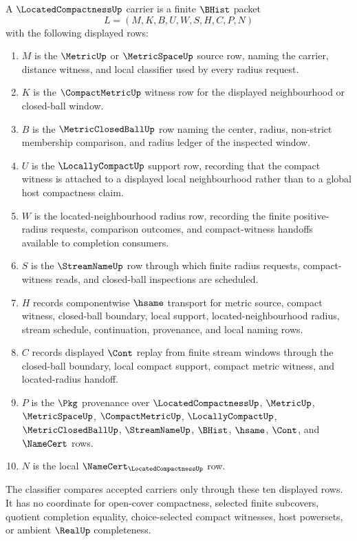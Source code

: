 \begin{definition}
\label{def:located-compactness-carrier}
A $\LocatedCompactnessUp$ carrier is a finite $\BHist$ packet
$$
L=(M,K,B,U,W,S,H,C,P,N)
$$
with the following displayed rows:
\begin{enumerate}
\item $M$ is the $\MetricUp$ or $\MetricSpaceUp$ source row, naming the carrier, distance witness, and local classifier used by every radius request.
\item $K$ is the $\CompactMetricUp$ witness row for the displayed neighbourhood or closed-ball window.
\item $B$ is the $\MetricClosedBallUp$ row naming the center, radius, non-strict membership comparison, and radius ledger of the inspected window.
\item $U$ is the $\LocallyCompactUp$ support row, recording that the compact witness is attached to a displayed local neighbourhood rather than to a global host compactness claim.
\item $W$ is the located-neighbourhood radius row, recording the finite positive-radius requests, comparison outcomes, and compact-witness handoffs available to completion consumers.
\item $S$ is the $\StreamNameUp$ row through which finite radius requests, compact-witness reads, and closed-ball inspections are scheduled.
\item $H$ records componentwise $\hsame$ transport for metric source, compact witness, closed-ball boundary, local support, located-neighbourhood radius, stream schedule, continuation, provenance, and local naming rows.
\item $C$ records displayed $\Cont$ replay from finite stream windows through the closed-ball boundary, local compact support, compact metric witness, and located-radius handoff.
\item $P$ is the $\Pkg$ provenance over $\LocatedCompactnessUp$, $\MetricUp$, $\MetricSpaceUp$, $\CompactMetricUp$, $\LocallyCompactUp$, $\MetricClosedBallUp$, $\StreamNameUp$, $\BHist$, $\hsame$, $\Cont$, and $\NameCert$ rows.
\item $N$ is the local $\NameCert_{\LocatedCompactnessUp}$ row.
\end{enumerate}
The classifier compares accepted carriers only through these ten displayed rows. It has no coordinate for open-cover compactness, selected finite subcovers, quotient completion equality, choice-selected compact witnesses, host powersets, or ambient $\RealUp$ completeness.
\end{definition}
